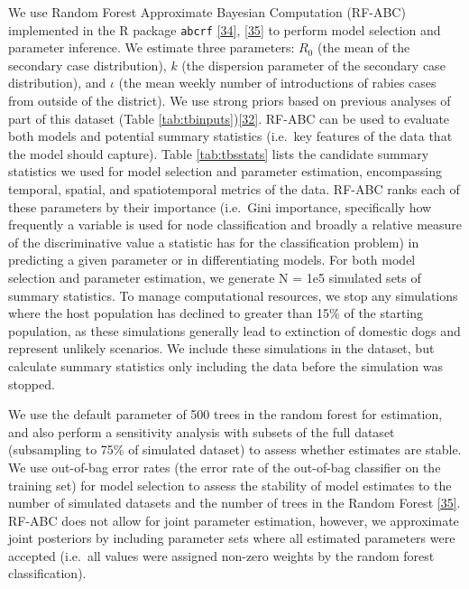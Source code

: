\documentclass[
  oneside]{book}
\begin{document}
We use Random Forest Approximate Bayesian Computation (RF-ABC) implemented in the R package \texttt{abcrf} \protect\hyperlink{ref-pudlo2015}{{[}34{]}}, \protect\hyperlink{ref-raynal2018}{{[}35{]}} to perform model selection and parameter inference. We estimate three parameters: \(R_{0}\) (the mean of the secondary case distribution), \(k\) (the dispersion parameter of the secondary case distribution), and \(\iota\) (the mean weekly number of introductions of rabies cases from outside of the district). We use strong priors based on previous analyses of part of this dataset (Table \ref{tab:tbinputs})\protect\hyperlink{ref-Hampson2009}{{[}32{]}}. RF-ABC can be used to evaluate both models and potential summary statistics (i.e.~key features of the data that the model should capture). Table \ref{tab:tbsstats} lists the candidate summary statistics we used for model selection and parameter estimation, encompassing temporal, spatial, and spatiotemporal metrics of the data. RF-ABC ranks each of these parameters by their importance (i.e.~Gini importance, specifically how frequently a variable is used for node classification and broadly a relative measure of the discriminative value a statistic has for the classification problem) in predicting a given parameter or in differentiating models. For both model selection and parameter estimation, we generate N = 1e5 simulated sets of summary statistics. To manage computational resources, we stop any simulations where the host population has declined to greater than 15\% of the starting population, as these simulations generally lead to extinction of domestic dogs and represent unlikely scenarios. We include these simulations in the dataset, but calculate summary statistics only including the data before the simulation was stopped.

We use the default parameter of 500 trees in the random forest for estimation, and also perform a sensitivity analysis with subsets of the full dataset (subsampling to 75\% of simulated dataset) to assess whether estimates are stable. We use out-of-bag error rates (the error rate of the out-of-bag classifier on the training set) for model selection to assess the stability of model estimates to the number of simulated datasets and the number of trees in the Random Forest \protect\hyperlink{ref-raynal2018}{{[}35{]}}. RF-ABC does not allow for joint parameter estimation, however, we approximate joint posteriors by including parameter sets where all estimated parameters were accepted (i.e.~all values were assigned non-zero weights by the random forest classification).
\end{document}
